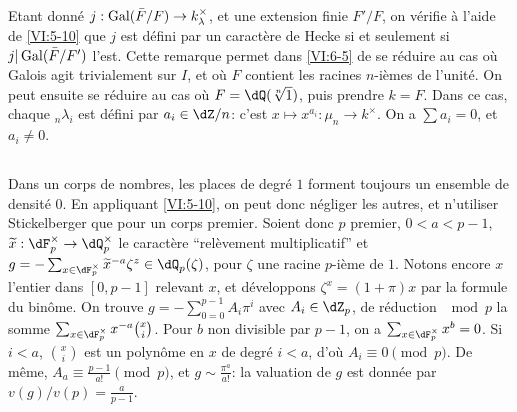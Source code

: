 Etant donn\'e $j:\operatorname{Gal}(\bar F/F) \to k_\lambda^\times$, et une extension finie 
$F'/F$, on v\'erifie \`a l'aide de \ref{VI:5-10} que $j$ est d\'efini par un 
caract\`ere de Hecke si et seulement si $j|\operatorname{Gal}(\bar F/F')$ l'est. Cette 
remarque permet dans \ref{VI:6-5} de se r\'eduire au cas o\`u Galois agit 
trivialement sur $I$, et o\`u $F$ contient les racines $n$-i\`emes de 
l'unit\'e. On peut ensuite se r\'eduire au cas o\`u $F=\dQ(\sqrt[n]{1})$, puis 
prendre $k=F$. Dans ce cas, chaque $_n \lambda_i$ est d\'efini par 
$a_i\in \dZ/n$: c'est $x\mapsto x^{a_i}:\mu_n \to k^\times$. On a 
$\sum a_i=0$, et $a_i\ne 0$. 





\subsection{}\label{VI:6-7}

Dans un corps de nombres, les places de degr\'e $1$ forment toujours un 
ensemble de densit\'e $0$. En appliquant \ref{VI:5-10}, on peut donc n\'egliger 
les autres, et n'utiliser Stickelberger que pour un corps premier. Soient donc 
$p$ premier, $0<a<p-1$, $\widetilde x:\dF_p^\times \to \dQ_p^\times$ le 
caract\`ere ``rel\`evement multiplicatif'' et 
$g=-\sum_{x\in \dF_p^\times} \widetilde x^{-a} \zeta^z\in \dQ_p(\zeta)$, pour 
$\zeta$ une racine $p$-i\`eme de $1$. Notons encore $x$ l'entier dans $[0,p-1]$ 
relevant $x$, et d\'eveloppons $\zeta^x=(1+\pi)x$ par la formule du bin\^ome. 
On trouve $g=-\sum_{0=0}^{p-1} A_i\pi^i$ avec $A_i\in \dZ_p$, de r\'eduction 
$\mod p$ la somme $\sum_{x\in \dF_p^\times} x^{-a} \binom x i$. Pour $b$ non 
divisible par $p-1$, on a $\sum_{x\in \dF_p^\times} x^b=0$. Si $i<a$, 
$\binom x i$ est un polyn\^ome en $x$ de degr\'e $i<a$, d'o\`u 
$A_i\equiv 0\pmod p$. De m\^eme, $A_a\equiv \frac{p-1}{a!} \pmod p$, et 
$g\sim \frac{\pi^a}{a!}$: la valuation de $g$ est donn\'ee par 
$v(g)/v(p) = \frac{a}{p-1}$. 





\subsection{}\label{VI:6-8}

